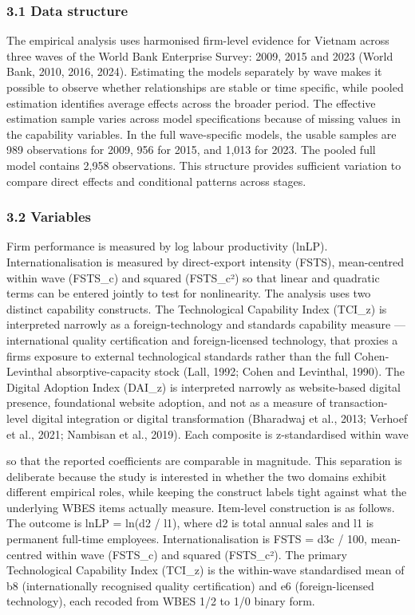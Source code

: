 \documentclass[12pt,a4paper]{article}
\begin{document}
\hypertarget{31-data-structure}{%
\subsubsection{3.1 Data structure}\label{31-data-structure}}

The empirical analysis uses harmonised firm-level evidence for Vietnam
across three waves of the World Bank Enterprise Survey: 2009, 2015 and
2023 (World Bank, 2010, 2016, 2024). Estimating the models separately by
wave makes it possible to observe whether relationships are stable or
time specific, while pooled estimation identifies average effects across
the broader period. The effective estimation sample varies across model
specifications because of missing values in the capability variables. In
the full wave-specific models, the usable samples are 989 observations
for 2009, 956 for 2015, and 1,013 for 2023. The pooled full model
contains 2,958 observations. This structure provides sufficient
variation to compare direct effects and conditional patterns across
stages.

\hypertarget{32-variables}{%
\subsubsection{3.2 Variables}\label{32-variables}}

Firm performance is measured by log labour productivity (lnLP).
Internationalisation is measured by direct-export intensity (FSTS),
mean-centred within wave (FSTS\_c) and squared (FSTS\_c²) so that linear
and quadratic terms can be entered jointly to test for nonlinearity. The
analysis uses two distinct capability constructs. The Technological
Capability Index (TCI\_z) is interpreted narrowly as a
foreign-technology and standards capability measure --- international
quality certification and foreign-licensed technology, that proxies a
firm\textquotesingle s exposure to external technological standards
rather than the full Cohen-Levinthal absorptive-capacity stock (Lall,
1992; Cohen and Levinthal, 1990). The Digital Adoption Index (DAI\_z) is
interpreted narrowly as website-based digital presence, foundational
website adoption, and not as a measure of transaction-level digital
integration or digital transformation (Bharadwaj et al., 2013; Verhoef
et al., 2021; Nambisan et al., 2019). Each composite is z-standardised
within wave

so that the reported coefficients are comparable in magnitude. This
separation is deliberate because the study is interested in whether the
two domains exhibit different empirical roles, while keeping the
construct labels tight against what the underlying WBES items actually
measure. Item-level construction is as follows. The outcome is lnLP =
ln(d2 / l1), where d2 is total annual sales and l1 is permanent
full-time employees. Internationalisation is FSTS = d3c / 100,
mean-centred within wave (FSTS\_c) and squared (FSTS\_c²). The primary
Technological Capability Index (TCI\_z) is the within-wave standardised
mean of b8 (internationally recognised quality certification) and e6
(foreign-licensed technology), each recoded from WBES 1/2 to 1/0 binary
form.
\end{document}
